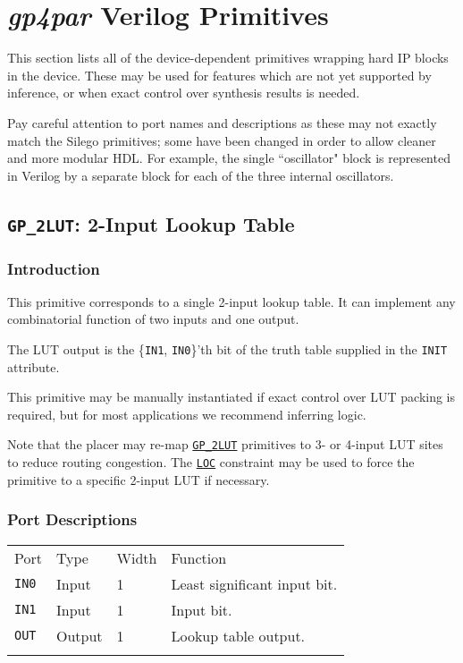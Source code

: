 \documentclass[11pt]{article}
\newcommand{\namestyle}[1]{\textit{#1}}
\newcommand{\tokenstyle}[1]{\texttt{#1}}
\newcommand{\whenstyle}[1]{{\fontseries{sb}\selectfont#1}}
\newcommand{\tokenref}[2]{\hyperref[#2]{\tokenstyle{#1}}}
\newcommand{\thinhline}{\Xhline{1\arrayrulewidth}}
\newcommand{\thickhline}{\Xhline{2.5\arrayrulewidth}}
\begin{document}
\pagebreak
\section{\namestyle{gp4par} Verilog Primitives}

This section lists all of the device-dependent primitives wrapping hard IP blocks in the device. These may be used for
features which are not yet supported by inference, or when exact control over synthesis results is needed.

Pay careful attention to port names and descriptions as these may not exactly match the Silego primitives; some have
been changed in order to allow cleaner and more modular HDL. For example, the single ``oscillator" block is represented
in Verilog by a separate block for each of the three internal oscillators.


\pagebreak
\subsection{\tokenstyle{GP\_2LUT}: 2-Input Lookup Table}
\label{gp-2lut}

\subsubsection{Introduction}
This primitive corresponds to a single 2-input lookup table. It can implement any combinatorial function of two
inputs and one output.

The LUT output is the \{\tokenstyle{IN1}, \tokenstyle{IN0}\}'th bit of the truth table supplied in the \tokenstyle{INIT} attribute.

This primitive may be manually instantiated if exact control over LUT packing is required, but for most applications we
recommend inferring logic.

Note that the placer may re-map \tokenref{GP\_2LUT}{gp-2lut} primitives to 3- or 4-input LUT sites to reduce routing
congestion. The \tokenref{LOC}{LOC} constraint may be used to force the primitive to a specific 2-input LUT if
necessary.

\subsubsection{Port Descriptions}

\begin{tabularx}{\textwidth}{lllX}
\thinhline
\whenstyle{Port} & \whenstyle{Type} & \whenstyle{Width} & \whenstyle{Function} \\
\thickhline
\tokenstyle{IN0} & Input & 1 & Least significant input bit. \\
\thinhline
\tokenstyle{IN1} & Input & 1 & Input bit. \\
\thinhline
\tokenstyle{OUT} & Output & 1 & Lookup table output. \\
\thinhline
\end{tabularx}
\end{document}
